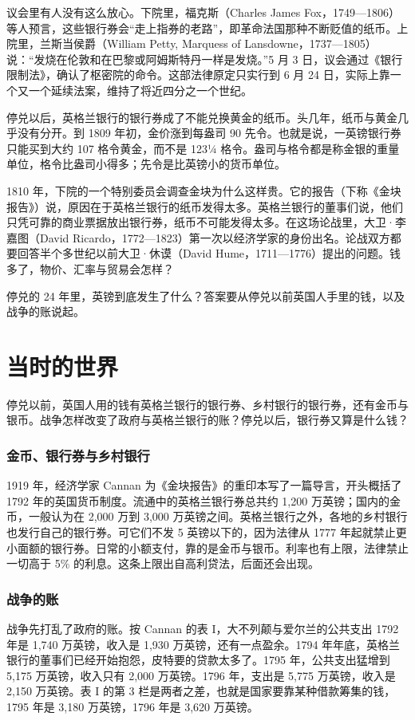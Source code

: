 议会里有人没有这么放心。下院里，福克斯（Charles James Fox，1749—1806）等人预言，这些银行券会“走上指券的老路”，即革命法国那种不断贬值的纸币。上院里，兰斯当侯爵（William Petty, Marquess of Lansdowne，1737—1805）说：“发烧在伦敦和在巴黎或阿姆斯特丹一样是发烧。”\cite{cannan1919}5 月 3 日，议会通过《银行限制法》，确认了枢密院的命令。这部法律原定只实行到 6 月 24 日，实际上靠一个又一个延续法案，维持了将近四分之一个世纪\cite{cannan1919}。

停兑以后，英格兰银行的银行券成了不能兑换黄金的纸币。头几年，纸币与黄金几乎没有分开。到 1809 年初，金价涨到每盎司 90 先令。也就是说，一英镑银行券只能买到大约 107 格令黄金，而不是 123¼ 格令\cite{cannan1919}。盎司与格令都是称金银的重量单位，格令比盎司小得多；先令是比英镑小的货币单位。

1810 年，下院的一个特别委员会调查金块为什么这样贵。它的报告（下称《金块报告》）说，原因在于英格兰银行的纸币发得太多。英格兰银行的董事们说，他们只凭可靠的商业票据放出银行券，纸币不可能发得太多。在这场论战里，大卫·李嘉图（David Ricardo，1772—1823）第一次以经济学家的身份出名。论战双方都要回答半个多世纪以前大卫·休谟（David Hume，1711—1776）提出的问题。钱多了，物价、汇率与贸易会怎样？

停兑的 24 年里，英镑到底发生了什么？答案要从停兑以前英国人手里的钱，以及战争的账说起。

\section{当时的世界}\label{sec:bullion-world}

停兑以前，英国人用的钱有英格兰银行的银行券、乡村银行的银行券，还有金币与银币。战争怎样改变了政府与英格兰银行的账？停兑以后，银行券又算是什么钱？

\subsubsection{金币、银行券与乡村银行}
1919 年，经济学家 Cannan 为《金块报告》的重印本写了一篇导言，开头概括了 1792 年的英国货币制度\cite{cannan1919}。流通中的英格兰银行券总共约 1,200 万英镑；国内的金币，一般认为在 2,000 万到 3,000 万英镑之间\cite{cannan1919}。英格兰银行之外，各地的乡村银行也发行自己的银行券。可它们不发 5 英镑以下的，因为法律从 1777 年起就禁止更小面额的银行券\cite{cannan1919}。日常的小额支付，靠的是金币与银币。利率也有上限，法律禁止一切高于 5\% 的利息\cite{cannan1919}。这条上限出自高利贷法，后面还会出现。

\subsubsection{战争的账}
战争先打乱了政府的账。按 Cannan 的表 I，大不列颠与爱尔兰的公共支出 1792 年是 1,740 万英镑，收入是 1,930 万英镑，还有一点盈余。1794 年年底，英格兰银行的董事们已经开始抱怨，皮特要的贷款太多了\cite{cannan1919}。1795 年，公共支出猛增到 5,175 万英镑，收入只有 2,000 万英镑。1796 年，支出是 5,775 万英镑，收入是 2,150 万英镑\cite{cannan1919}。表 I 的第 3 栏是两者之差，也就是国家要靠某种借款筹集的钱，1795 年是 3,180 万英镑，1796 年是 3,620 万英镑\cite{cannan1919}。

